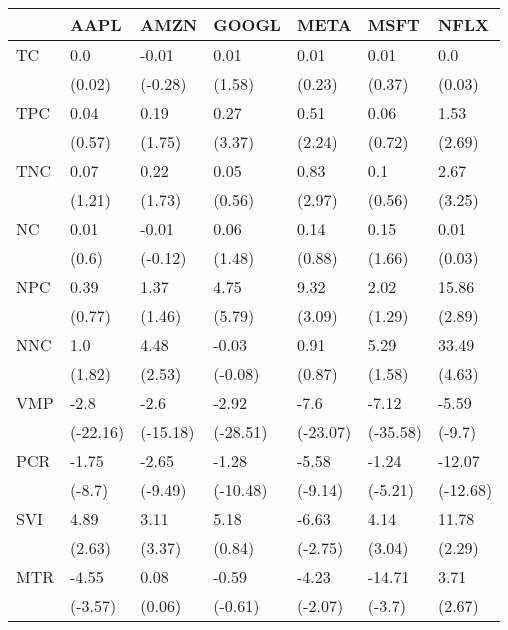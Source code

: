 \begin{tabular}{lllllll}
\toprule
{} &      AAPL &      AMZN &     GOOGL &      META &      MSFT &      NFLX \\
\midrule
TC  &       0.0 &     -0.01 &      0.01 &      0.01 &      0.01 &       0.0 \\
    &    (0.02) &   (-0.28) &    (1.58) &    (0.23) &    (0.37) &    (0.03) \\
TPC &      0.04 &      0.19 &      0.27 &      0.51 &      0.06 &      1.53 \\
    &    (0.57) &    (1.75) &    (3.37) &    (2.24) &    (0.72) &    (2.69) \\
TNC &      0.07 &      0.22 &      0.05 &      0.83 &       0.1 &      2.67 \\
    &    (1.21) &    (1.73) &    (0.56) &    (2.97) &    (0.56) &    (3.25) \\
NC  &      0.01 &     -0.01 &      0.06 &      0.14 &      0.15 &      0.01 \\
    &     (0.6) &   (-0.12) &    (1.48) &    (0.88) &    (1.66) &    (0.03) \\
NPC &      0.39 &      1.37 &      4.75 &      9.32 &      2.02 &     15.86 \\
    &    (0.77) &    (1.46) &    (5.79) &    (3.09) &    (1.29) &    (2.89) \\
NNC &       1.0 &      4.48 &     -0.03 &      0.91 &      5.29 &     33.49 \\
    &    (1.82) &    (2.53) &   (-0.08) &    (0.87) &    (1.58) &    (4.63) \\
VMP &      -2.8 &      -2.6 &     -2.92 &      -7.6 &     -7.12 &     -5.59 \\
    &  (-22.16) &  (-15.18) &  (-28.51) &  (-23.07) &  (-35.58) &    (-9.7) \\
PCR &     -1.75 &     -2.65 &     -1.28 &     -5.58 &     -1.24 &    -12.07 \\
    &    (-8.7) &   (-9.49) &  (-10.48) &   (-9.14) &   (-5.21) &  (-12.68) \\
SVI &      4.89 &      3.11 &      5.18 &     -6.63 &      4.14 &     11.78 \\
    &    (2.63) &    (3.37) &    (0.84) &   (-2.75) &    (3.04) &    (2.29) \\
MTR &     -4.55 &      0.08 &     -0.59 &     -4.23 &    -14.71 &      3.71 \\
    &   (-3.57) &    (0.06) &   (-0.61) &   (-2.07) &    (-3.7) &    (2.67) \\
\bottomrule
\end{tabular}
